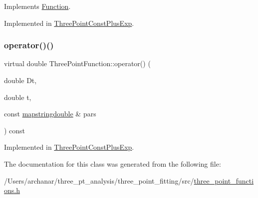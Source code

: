 Implements \mbox{\hyperlink{classFunction_a8cd7f815d5f883cc523341c53ba811d0}{Function}}.



Implemented in \mbox{\hyperlink{classThreePointConstPlusExp_aabb955a37221d2dc9cff3528a1564584}{Three\+Point\+Const\+Plus\+Exp}}.

\mbox{\label{classThreePointFunction_aa8a937bb564124ba5852898cd47e9fb3}} 
\subsubsection{\texorpdfstring{operator()()}{operator()()}\hspace{0.1cm}{\footnotesize\ttfamily [2/2]}}
{\footnotesize\ttfamily virtual double Three\+Point\+Function\+::operator() (\begin{DoxyParamCaption}\item[{double}]{Dt,  }\item[{double}]{t,  }\item[{const \mbox{\hyperlink{lib_2fitting__lib_2includes_8h_a647b481c557c7966517f753340a81d13}{mapstringdouble}} \&}]{pars }\end{DoxyParamCaption}) const\hspace{0.3cm}{\ttfamily [pure virtual]}}



Implemented in \mbox{\hyperlink{classThreePointConstPlusExp_abe81611888105afdb0014bc1b9c2c269}{Three\+Point\+Const\+Plus\+Exp}}.



The documentation for this class was generated from the following file\+:\begin{DoxyCompactItemize}
\item 
/\+Users/archanar/three\+\_\+pt\+\_\+analysis/three\+\_\+point\+\_\+fitting/src/\mbox{\hyperlink{three__point__functions_8h}{three\+\_\+point\+\_\+functions.\+h}}\end{DoxyCompactItemize}
